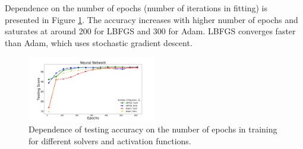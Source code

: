 Dependence on the number of epochs (number of iterations in fitting) is presented in Figure \ref{fig:NN_epochs}. 
The accuracy increases with higher number of epochs and saturates at around 200 for LBFGS and 300 for Adam. LBFGS converges faster than Adam, which uses stochastic gradient descent.



\begin{figure}[h]
\hspace*{-0.5cm}
\includegraphics[width=0.5\textwidth]{plots/nn_train_epochs_assocnewfeat.pdf}
\caption{
Dependence of testing accuracy on the number of epochs in training for different solvers and activation functions.
}
\label{fig:NN_epochs}
\end{figure}

